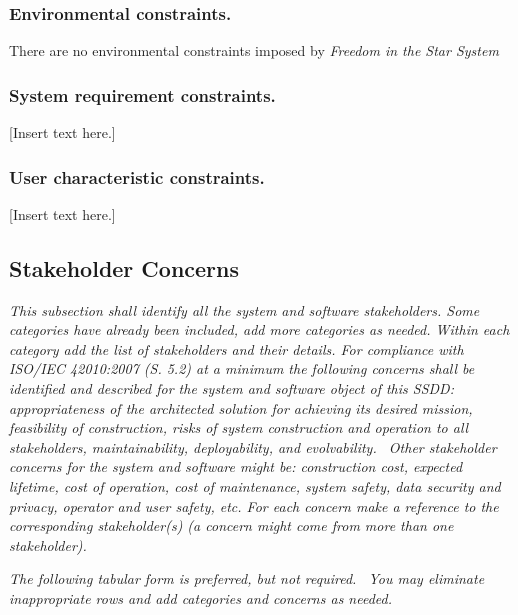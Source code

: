 \documentclass[twoside,letterpaper]{article}
\begin{document}
\subsubsection{Environmental constraints.}
There are no environmental constraints imposed by \textit{Freedom in the Star System}

\subsubsection{System requirement constraints.}
[Insert text here.]

\subsubsection{User characteristic constraints.}
[Insert text here.]

\subsection{Stakeholder Concerns}
{\itshape\color{black}
This subsection shall identify all the system and software stakeholders.
Some categories have already been included, add more categories as
needed. Within each category add the list of stakeholders and their
details. For compliance with ISO/IEC 42010:2007 (S. 5.2) at a minimum the
following concerns shall be identified and described for the system and
software object of this SSDD: appropriateness of the architected
solution for achieving its desired mission, feasibility of
construction, risks of system construction and operation to all
stakeholders, maintainability, deployability, and evolvability. \ Other
stakeholder concerns for the system and software might be: construction
cost, expected lifetime, cost of operation, cost of maintenance, system
safety, data security and privacy, operator and user safety, etc. For
each concern make a reference to the corresponding stakeholder(s) (a
concern might come from more than one stakeholder).}


\bigskip

{\itshape\color{black}
The following tabular form is preferred, but not required. \ You may
eliminate inappropriate rows and add categories and concerns as
needed.}
\end{document}

